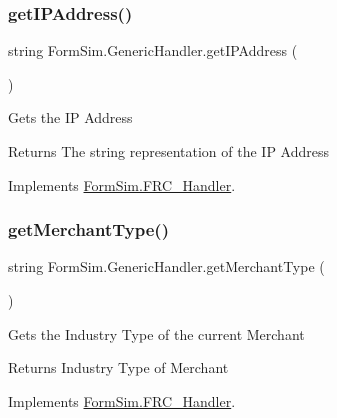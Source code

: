 \subsubsection{\texorpdfstring{get\+I\+P\+Address()}{getIPAddress()}}
{\footnotesize\ttfamily string Form\+Sim.\+Generic\+Handler.\+get\+I\+P\+Address (\begin{DoxyParamCaption}{ }\end{DoxyParamCaption})\hspace{0.3cm}{\ttfamily [inline]}}



Gets the IP Address 

\begin{DoxyReturn}{Returns}
The string representation of the IP Address
\end{DoxyReturn}


Implements \mbox{\hyperlink{interface_form_sim_1_1_f_r_c___handler_ab4c19dd9eb34e0375b8a436fd01b79d0}{Form\+Sim.\+F\+R\+C\+\_\+\+Handler}}.

\mbox{\label{class_form_sim_1_1_generic_handler_a9bef42bcd6992d96947612aaab8f88a7}} 
\subsubsection{\texorpdfstring{get\+Merchant\+Type()}{getMerchantType()}}
{\footnotesize\ttfamily string Form\+Sim.\+Generic\+Handler.\+get\+Merchant\+Type (\begin{DoxyParamCaption}{ }\end{DoxyParamCaption})\hspace{0.3cm}{\ttfamily [inline]}}



Gets the Industry Type of the current Merchant 

\begin{DoxyReturn}{Returns}
Industry Type of Merchant
\end{DoxyReturn}


Implements \mbox{\hyperlink{interface_form_sim_1_1_f_r_c___handler_ad7484e0f6199cfae3beb33d91d6f1368}{Form\+Sim.\+F\+R\+C\+\_\+\+Handler}}.

\mbox{\label{class_form_sim_1_1_generic_handler_a0e6f8152a789ba9f82501d45b029de71}} 
